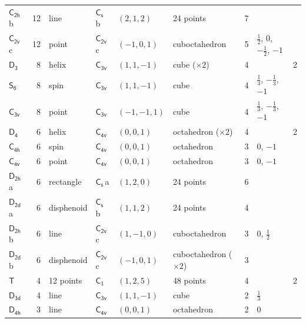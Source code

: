 \documentclass[10pt,a4paper]{article}
\numberwithin{equation}{section}
\newcommand{\grp}[1]{\mathsf{#1}}
\newcommand{\clsletter}[1]{\,{\scriptsize\color{black!55}#1}}
\newlength{\fillwidth}\newlength{\cellwidth}\newlength{\colwidth}
\begin{document}
{{\begin{longtable}{@{}lrllllr>{\RaggedRight\arraybackslash}p{\fillwidth}r@{}}
\href{C2h.pdf}{$\grp{C_{2h}}$}\clsletter{b} & 12 & line & \href{C1v.pdf}{$\grp{C_{s}}$}\clsletter{b} & $(2, 1, 2)$ & 24 points & 7 &  & \\
\href{C2v.pdf}{$\grp{C_{2v}}$}\clsletter{c} & 12 & point & \href{C2v.pdf}{$\grp{C_{2v}}$}\clsletter{c} & $(-1, 0, 1)$ & cuboctahedron & 5 & ${\tfrac{1}{2}}$, ${0}$, ${-\tfrac{1}{2}}$, ${-1}$ & \\
\href{D3.pdf}{$\grp{D_{3}}$} & 8 & helix & \href{C3v.pdf}{$\grp{C_{3v}}$} & $(1, 1, -1)$ & cube (${\times}2$) & 4 &  & 2\\
\href{S6.pdf}{$\grp{S_{6}}$} & 8 & spin & \href{C3v.pdf}{$\grp{C_{3v}}$} & $(1, 1, -1)$ & cube & 4 & ${\tfrac{1}{3}}$, ${-\tfrac{1}{3}}$, ${-1}$ & \\
\href{C3v.pdf}{$\grp{C_{3v}}$} & 8 & point & \href{C3v.pdf}{$\grp{C_{3v}}$} & $(-1, -1, 1)$ & cube & 4 & ${\tfrac{1}{3}}$, ${-\tfrac{1}{3}}$, ${-1}$ & \\
\href{D4.pdf}{$\grp{D_{4}}$} & 6 & helix & \href{C4v.pdf}{$\grp{C_{4v}}$} & $(0, 0, 1)$ & octahedron (${\times}2$) & 4 &  & 2\\
\href{C4h.pdf}{$\grp{C_{4h}}$} & 6 & spin & \href{C4v.pdf}{$\grp{C_{4v}}$} & $(0, 0, 1)$ & octahedron & 3 & ${0}$, ${-1}$ & \\
\href{C4v.pdf}{$\grp{C_{4v}}$} & 6 & point & \href{C4v.pdf}{$\grp{C_{4v}}$} & $(0, 0, 1)$ & octahedron & 3 & ${0}$, ${-1}$ & \\
\href{D2h.pdf}{$\grp{D_{2h}}$}\clsletter{a} & 6 & rectangle & \href{C1v.pdf}{$\grp{C_{s}}$}\clsletter{a} & $(1, 2, 0)$ & 24 points & 6 &  & \\
\href{D2d.pdf}{$\grp{D_{2d}}$}\clsletter{a} & 6 & disphenoid & \href{C1v.pdf}{$\grp{C_{s}}$}\clsletter{b} & $(1, 1, 2)$ & 24 points & 4 &  & \\
\href{D2h.pdf}{$\grp{D_{2h}}$}\clsletter{b} & 6 & line & \href{C2v.pdf}{$\grp{C_{2v}}$}\clsletter{c} & $(1, -1, 0)$ & cuboctahedron & 3 & ${0}$, ${\tfrac{1}{2}}$ & \\
\href{D2d.pdf}{$\grp{D_{2d}}$}\clsletter{b} & 6 & disphenoid & \href{C2v.pdf}{$\grp{C_{2v}}$}\clsletter{c} & $(-1, 0, 1)$ & cuboctahedron (${\times}2$) & 3 &  & \\
\href{T.pdf}{$\grp{T}$} & 4 & 12 points & \href{C1.pdf}{$\grp{C_{1}}$} & $(1, 2, 5)$ & 48 points & 4 &  & 2\\
\href{D3d.pdf}{$\grp{D_{3d}}$} & 4 & line & \href{C3v.pdf}{$\grp{C_{3v}}$} & $(1, 1, -1)$ & cube & 2 & ${\tfrac{1}{3}}$ & \\
\href{D4h.pdf}{$\grp{D_{4h}}$} & 3 & line & \href{C4v.pdf}{$\grp{C_{4v}}$} & $(0, 0, 1)$ & octahedron & 2 & ${0}$ & \\

\end{longtable}}}
\end{document}
